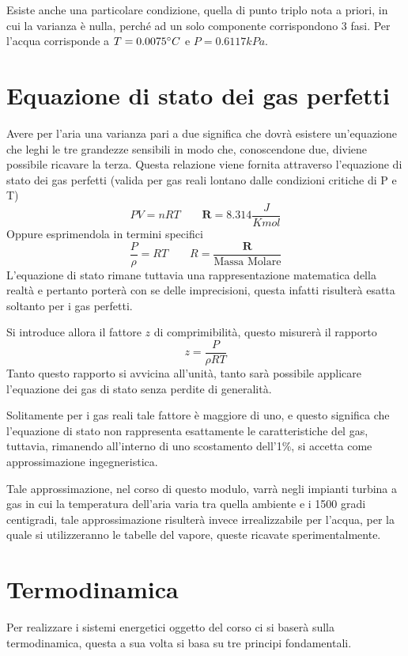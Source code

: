 \begin{adjustwidth}{2in}{}
	Esiste anche una particolare condizione,  quella di punto triplo nota a priori, in cui la varianza è nulla, perché ad un solo componente corrispondono 3 fasi. Per l'acqua corrisponde a $T = 0.0075\degree C$ e $P = 0.6117 kPa$. \newline
	
	\section{Equazione di stato dei gas perfetti}
	Avere per l'aria una varianza pari a due significa che dovrà esistere un'equazione che leghi le tre grandezze sensibili in modo che, conoscendone due, diviene possibile ricavare la terza. Questa relazione viene fornita attraverso l'equazione di stato dei gas perfetti (valida per gas reali lontano dalle condizioni critiche di P e T)
	\begin{equation} \label{eq:1.1}
		\boxed{PV=nRT \qquad \textbf{R} = 8.314 \dfrac{J}{Kmol}}
	\end{equation} 
	Oppure esprimendola in termini specifici
	\[\dfrac{P}{\rho} = RT \qquad R = \dfrac{\textbf{R}}{\text{Massa Molare}} \]
	L'equazione di stato rimane tuttavia una rappresentazione matematica della realtà e pertanto porterà con se delle imprecisioni, questa infatti risulterà esatta soltanto per i gas perfetti.
	
	Si introduce allora il fattore $z$ di comprimibilità, questo misurerà il rapporto 
	\[z = \dfrac{P}{\rho RT} \]
	Tanto questo rapporto si avvicina all'unità, tanto sarà possibile applicare l'equazione dei gas di stato senza perdite di generalità.
	
	Solitamente per i gas reali tale fattore è maggiore di uno, e questo significa che l'equazione di stato non rappresenta esattamente le caratteristiche del gas, tuttavia, rimanendo all'interno di uno scostamento dell'1\%, si accetta come approssimazione ingegneristica. 
	
	Tale approssimazione, nel corso di questo modulo, varrà negli impianti turbina a gas in cui la temperatura dell'aria varia tra quella ambiente e i 1500 gradi centigradi, tale approssimazione risulterà invece irrealizzabile per l'acqua, per la quale si utilizzeranno le tabelle del vapore, queste ricavate sperimentalmente. 

\newpage
	
	\section{Termodinamica}
	Per realizzare i sistemi energetici oggetto del corso ci si baserà sulla termodinamica, questa a sua volta si basa su tre principi fondamentali. 
	

\end{adjustwidth}
